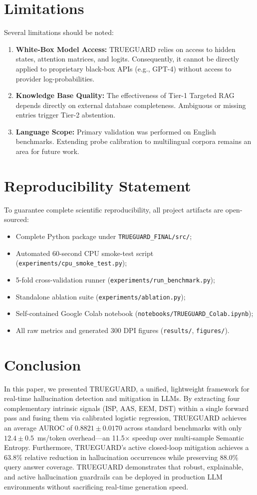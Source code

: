 \documentclass[journal]{IEEEtran}
\begin{document}
\section{Limitations}
Several limitations should be noted:
\begin{enumerate}
    \item \textbf{White-Box Model Access:} TRUEGUARD relies on access to hidden states, attention matrices, and logits. Consequently, it cannot be directly applied to proprietary black-box APIs (e.g., GPT-4) without access to provider log-probabilities.
    \item \textbf{Knowledge Base Quality:} The effectiveness of Tier-1 Targeted RAG depends directly on external database completeness. Ambiguous or missing entries trigger Tier-2 abstention.
    \item \textbf{Language Scope:} Primary validation was performed on English benchmarks. Extending probe calibration to multilingual corpora remains an area for future work.
\end{enumerate}

\section{Reproducibility Statement}
To guarantee complete scientific reproducibility, all project artifacts are open-sourced:
\begin{itemize}
    \item Complete Python package under \texttt{TRUEGUARD\_FINAL/src/};
    \item Automated 60-second CPU smoke-test script (\texttt{experiments/cpu\_smoke\_test.py});
    \item 5-fold cross-validation runner (\texttt{experiments/run\_benchmark.py});
    \item Standalone ablation suite (\texttt{experiments/ablation.py});
    \item Self-contained Google Colab notebook (\texttt{notebooks/TRUEGUARD\_Colab.ipynb});
    \item All raw metrics and generated 300 DPI figures (\texttt{results/}, \texttt{figures/}).
\end{itemize}

\section{Conclusion}
In this paper, we presented TRUEGUARD, a unified, lightweight framework for real-time hallucination detection and mitigation in LLMs. By extracting four complementary intrinsic signals (ISP, AAS, EEM, DST) within a single forward pass and fusing them via calibrated logistic regression, TRUEGUARD achieves an average AUROC of $0.8821 \pm 0.0170$ across standard benchmarks with only $12.4 \pm 0.5$~ms/token overhead---an 11.5$\times$ speedup over multi-sample Semantic Entropy. Furthermore, TRUEGUARD's active closed-loop mitigation achieves a 63.8\% relative reduction in hallucination occurrences while preserving 88.0\% query answer coverage. TRUEGUARD demonstrates that robust, explainable, and active hallucination guardrails can be deployed in production LLM environments without sacrificing real-time generation speed.
\end{document}
